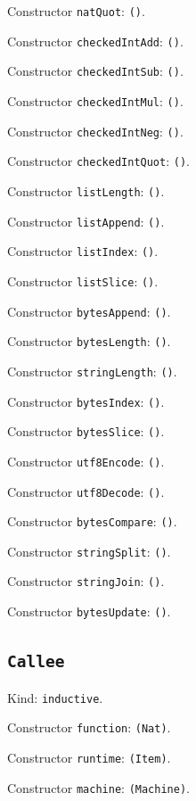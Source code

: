 \documentclass[11pt]{article}
\begin{document}
\noindent Constructor \texttt{natQuot}: \texttt{()}.\par
\noindent Constructor \texttt{checkedIntAdd}: \texttt{()}.\par
\noindent Constructor \texttt{checkedIntSub}: \texttt{()}.\par
\noindent Constructor \texttt{checkedIntMul}: \texttt{()}.\par
\noindent Constructor \texttt{checkedIntNeg}: \texttt{()}.\par
\noindent Constructor \texttt{checkedIntQuot}: \texttt{()}.\par
\noindent Constructor \texttt{listLength}: \texttt{()}.\par
\noindent Constructor \texttt{listAppend}: \texttt{()}.\par
\noindent Constructor \texttt{listIndex}: \texttt{()}.\par
\noindent Constructor \texttt{listSlice}: \texttt{()}.\par
\noindent Constructor \texttt{bytesAppend}: \texttt{()}.\par
\noindent Constructor \texttt{bytesLength}: \texttt{()}.\par
\noindent Constructor \texttt{stringLength}: \texttt{()}.\par
\noindent Constructor \texttt{bytesIndex}: \texttt{()}.\par
\noindent Constructor \texttt{bytesSlice}: \texttt{()}.\par
\noindent Constructor \texttt{utf8Encode}: \texttt{()}.\par
\noindent Constructor \texttt{utf8Decode}: \texttt{()}.\par
\noindent Constructor \texttt{bytesCompare}: \texttt{()}.\par
\noindent Constructor \texttt{stringSplit}: \texttt{()}.\par
\noindent Constructor \texttt{stringJoin}: \texttt{()}.\par
\noindent Constructor \texttt{bytesUpdate}: \texttt{()}.\par
\subsection*{\texttt{Callee}}
\noindent Kind: \texttt{inductive}.\par
\noindent Constructor \texttt{function}: \texttt{(Nat)}.\par
\noindent Constructor \texttt{runtime}: \texttt{(Item)}.\par
\noindent Constructor \texttt{machine}: \texttt{(Machine)}.\par
\end{document}
